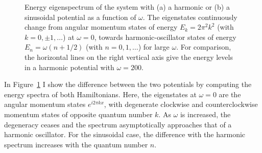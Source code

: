 \begin{figure}
\centering
{}

\caption{ Energy eigenspectrum of the system with (a) a harmonic or (b) a sinusoidal potential as a function of $\omega$. 
The eigenstates continuously change from angular momentum states of energy $E_k=2\pi^2 k^2$ (with $k=0,\pm1,\ldots$) at $\omega=0$, towards harmonic-oscillator states of energy $E_n=\omega(n+1/2)$ (with $n=0,1,\ldots$) for large $\omega$.
For comparison, the horizontal lines on the right vertical axis give the energy levels in a harmonic potential with $\omega=200$.}
\label{fig:spectrum}
\end{figure}

In Figure~\ref{fig:spectrum} I show the difference between the two potentials by computing the energy spectra of both Hamiltonians.
Here, the eigenstates at $\omega=0$ are the angular momentum states $e^{i 2 \pi k x}$, with degenerate clockwise and counterclockwise momentum states of opposite quantum number $k$.
As $\omega$ is increased, the degeneracy ceases and the spectrum asymptotically approaches that of a harmonic oscillator.
For the sinusoidal case, the difference with the harmonic spectrum increases with the quantum number $n$.

